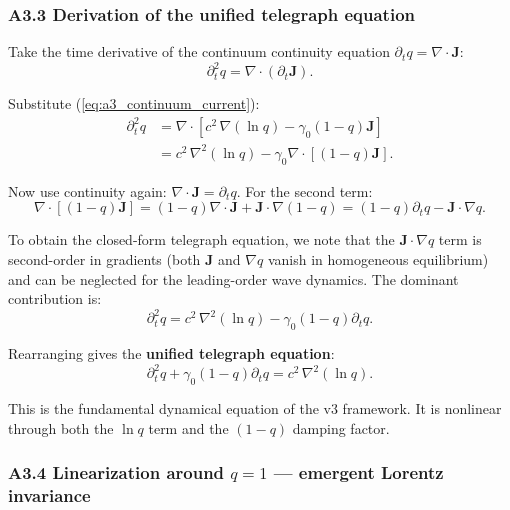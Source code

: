 \documentclass[reprint]{revtex4-2}
\begin{document}
\subsubsection{A3.3 Derivation of the unified telegraph equation}

Take the time derivative of the continuum continuity equation $\partial_t q = \nabla\cdot\mathbf{J}$:
\begin{equation}
\partial_t^2 q = \nabla\cdot(\partial_t\mathbf{J}).
\end{equation}

Substitute (\ref{eq:a3_continuum_current}):
\begin{align}
\partial_t^2 q &= \nabla\cdot\left[c^2\,\nabla(\ln q) - \gamma_0(1-q)\mathbf{J}\right] \\
&= c^2\,\nabla^2(\ln q) - \gamma_0\nabla\cdot[(1-q)\mathbf{J}].
\end{align}

Now use continuity again: $\nabla\cdot\mathbf{J} = \partial_t q$. For the second term:
\begin{equation}
\nabla\cdot[(1-q)\mathbf{J}] = (1-q)\nabla\cdot\mathbf{J} + \mathbf{J}\cdot\nabla(1-q) = (1-q)\partial_t q - \mathbf{J}\cdot\nabla q.
\end{equation}

To obtain the closed-form telegraph equation, we note that the $\mathbf{J}\cdot\nabla q$ term is second-order in gradients (both $\mathbf{J}$ and $\nabla q$ vanish in homogeneous equilibrium) and can be neglected for the leading-order wave dynamics. The dominant contribution is:
\begin{equation}
\partial_t^2 q = c^2\,\nabla^2(\ln q) - \gamma_0(1-q)\partial_t q.
\end{equation}

Rearranging gives the \textbf{unified telegraph equation}:
\begin{equation}
\boxed{\partial_t^2 q + \gamma_0(1-q)\partial_t q = c^2\,\nabla^2(\ln q)}.
\label{eq:a3_telegraph}
\end{equation}

This is the fundamental dynamical equation of the v3 framework. It is nonlinear through both the $\ln q$ term and the $(1-q)$ damping factor.

\subsubsection{A3.4 Linearization around $q=1$ --- emergent Lorentz invariance}
\end{document}
